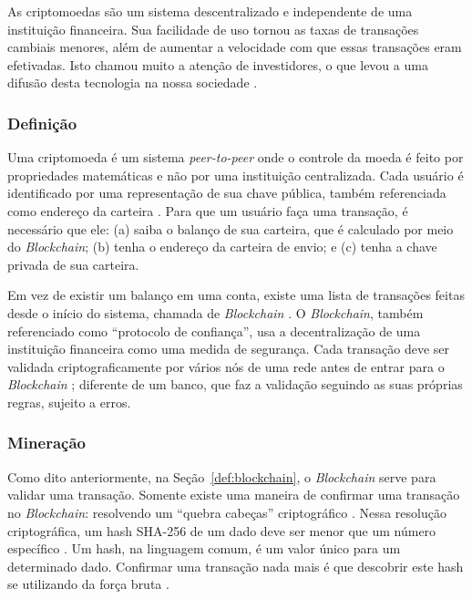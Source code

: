 \documentclass[
article,			%
12pt,				%
openright,			%
oneside,			%
a4paper,			%
chapter=TITLE,		%
section=TITLE,		%
subsection=TITLE,	%
subsubsection=TITLE,%
subsubsubsection=TITLE, %
english,			%
brazil,				%
]{abntex2}
\begin{document}
As criptomoedas são um sistema descentralizado e independente de uma
instituição financeira. Sua facilidade de uso tornou as taxas de
transações cambiais menores, além de aumentar a velocidade com que
essas transações eram efetivadas. Isto chamou muito a atenção de
investidores, o que levou a uma difusão desta tecnologia na nossa
sociedade \cite{Nakamoto2008, Prado2017}.

\subsubsection{Definição}

Uma criptomoeda é um sistema \emph{peer-to-peer} onde o controle da
moeda é feito por propriedades matemáticas e não por uma instituição
centralizada. Cada usuário é identificado por uma representação de sua
chave pública, também referenciada como endereço da carteira
\cite{Weber2012}. Para que um usuário faça uma transação, é necessário
que ele: (a) saiba o balanço de sua carteira, que é calculado por meio
do \emph{Blockchain}; (b) tenha o endereço da carteira de envio; e (c)
tenha a chave privada de sua carteira.

Em vez de existir um balanço em uma conta, existe uma lista de
transações feitas desde o início do sistema, chamada de
\emph{Blockchain} \cite{Weber2012}\label{def:blockchain}. O
\emph{Blockchain}, também referenciado como ``protocolo de
confiança'', usa a decentralização de uma instituição financeira como
uma medida de segurança. Cada transação deve ser validada
criptograficamente por vários nós de uma rede antes de entrar para o
\emph{Blockchain} \cite{LChicarino}; diferente de um banco, que faz a
validação seguindo as suas próprias regras, sujeito a erros.

\subsubsection{Mineração}

Como dito anteriormente, na Seção~\ref{def:blockchain}, o
\emph{Blockchain} serve para validar uma transação. Somente existe uma
maneira de confirmar uma transação no \emph{Blockchain}: resolvendo um
``quebra cabeças'' criptográfico \cite{Weber2012}. Nessa resolução
criptográfica, um hash SHA-256 de um dado deve ser menor que um número
específico \cite{Dev2014}. Um hash, na linguagem comum, é um valor
único para um determinado dado.  Confirmar uma transação nada mais é
que descobrir este hash se utilizando da força bruta \cite{Arsov}.
\end{document}
